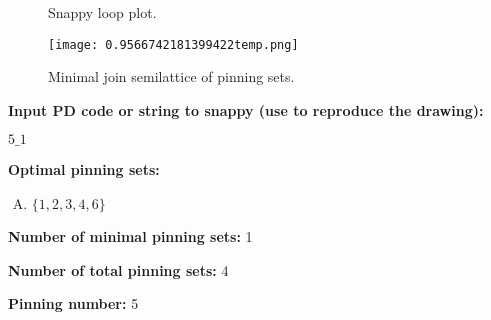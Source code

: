 \documentclass{article}%
\begin{document}
\begin{multicols}{2}
\begin{figure}[H]
\centering

\caption{Snappy loop plot.}
\label{fig:0.13301951206473572temp.svg}
\end{figure}\columnbreak

\begin{figure}[H]
\centering
\texttt{[image: 0.9566742181399422temp.png]}
\caption{Minimal join semilattice of pinning sets.}
\label{fig:0.9566742181399422temp.png}
\end{figure}\end{multicols}\newpage\begin{multicols}{2}

\columnbreak

\noindent\textbf{Input PD code or string to snappy (use to reproduce the drawing):}

	$5\_1$

\noindent\textbf{Optimal pinning sets:}

\begin{enumerate}[A)]
\item{\Huge\textcolor{red0}{\textbullet}}$\{1,2,3,4,6\}$

\end{enumerate}


\noindent\textbf{Number of minimal pinning sets:} 1

\noindent\textbf{Number of total pinning sets:} 4

\noindent\textbf{Pinning number:} 5


\end{multicols}
\end{document}
